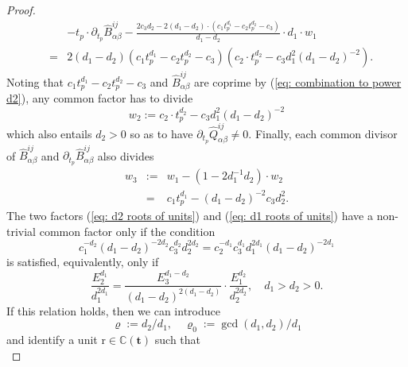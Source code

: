 \documentclass[10pt]{article}
\theoremstyle{remark}%
\theoremstyle{definition}%
\begin{document}
\begin{proof}
\begin{eqnarray}
&  & -t_{p}\cdot \partial_{t_{p}}\hat{B}_{\alpha\beta}^{ij}-\frac{2c_{3}d_{2}-2(d_{1}-d_{2})\cdot(c_{1}t_{p}^{d_{1}}-c_{2}t_{p}^{d_{2}}-c_{3})}{d_{1}-d_{2}}\cdot d_{1}\cdot w_{1}\nonumber \\
& = & 2(d_{1}-d_{2})\left(c_{1}t_{p}^{d_{1}}-c_{2}t_{p}^{d_{2}}-c_{3}\right)\left(c_{2}\cdot t_{p}^{d_{2}}-c_{3}d_{1}^{2}(d_{1}-d_{2})^{-2}\right).\label{eq: third common}
\end{eqnarray}
Noting that $c_{1}t_{p}^{d_{1}}-c_{2}t_{p}^{d_{2}}-c_{3}$ and $\hat{B}_{\alpha\beta}^{ij}$ are coprime by (\ref{eq: combination to power d2}), any common factor has to divide 
 \begin{equation}
w_{2}:=c_{2}\cdot t_{p}^{d_{2}}-c_{3}d_{1}^{2}(d_{1}-d_{2})^{-2}
\label{eq: d2 roots of units}
 \end{equation}
which also entails $d_{2}>0$ so as to have $\partial_{t_{p}}\hat{Q}_{\alpha\beta}^{ij}\neq0$. Finally, each common divisor of $\hat{B}_{\alpha\beta}^{ij}$ and $\partial_{t_{p}}\hat{B}_{\alpha\beta}^{ij}$ also divides
\begin{eqnarray}
w_{3} & := & w_{1}-(1-2d_{1}^{-1}d_{2})\cdot w_{2}\nonumber \\
& = & c_{1}t_{p}^{d_{1}}-(d_{1}-d_{2})^{-2}c_{3}d_{2}^{2}.
\label{eq: d1 roots of units}
\end{eqnarray}
The two factors (\ref{eq: d2 roots of units}) and (\ref{eq: d1 roots of units}) have a non-trivial common factor only if the condition 
 \begin{equation}
c_{1}^{-d_{2}}(d_{1}-d_{2})^{-2d_{2}}c_{3}^{d_{2}}d_{2}^{2d_{2}}=c_{2}^{-d_{1}}c_{3}^{d_{1}}d_{1}^{2d_{1}}(d_{1}-d_{2})^{-2d_{1}}\label{eq: condition monomials resonance in B, 0}
 \end{equation}
is satisfied, equivalently, only if 
 \begin{equation}
\frac{E_{2}^{d_{1}}}{d_{1}^{2d_{1}}}=\frac{E_{3}^{d_{1}-d_{2}}}{(d_{1}-d_{2})^{2(d_{1}-d_{2})}}\cdot\frac{E_{1}^{d_{2}}}{d_{2}^{2d_{2}}},\quad d_{1}>d_{2}>0.\label{eq: condition monomials resonance in B}
 \end{equation}
If this relation holds, then we can introduce  
 \begin{equation}
\varrho:=d_{2}/d_{1},\quad\varrho_{0}:=\gcd(d_{1},d_{2})/d_{1}
\label{eq: defining exponents for resonance}
 \end{equation}
and identify a unit $\mathrm{r}\in\mathbb{C}(\mathbf{t})$ such that 
\begin{equation}

\end{equation}
\end{proof}
\end{document}
